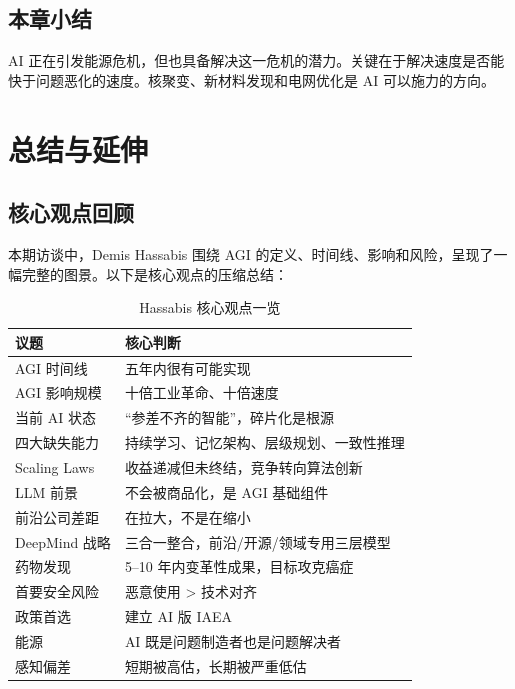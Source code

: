 \documentclass[a4paper]{article}
\begin{document}
\subsection{本章小结}

AI 正在引发能源危机，但也具备解决这一危机的潜力。关键在于解决速度是否能快于问题恶化的速度。核聚变、新材料发现和电网优化是 AI 可以施力的方向。

\section{总结与延伸}

\subsection{核心观点回顾}

本期访谈中，Demis Hassabis 围绕 AGI 的定义、时间线、影响和风险，呈现了一幅完整的图景。以下是核心观点的压缩总结：

\begin{table}[H]
\centering
\begin{tabular}{p{} p{}}
\toprule
\textbf{议题} & \textbf{核心判断} \\
\midrule
AGI 时间线 & 五年内很有可能实现 \\
AGI 影响规模 & 十倍工业革命、十倍速度 \\
当前 AI 状态 & ``参差不齐的智能''，碎片化是根源 \\
四大缺失能力 & 持续学习、记忆架构、层级规划、一致性推理 \\
Scaling Laws & 收益递减但未终结，竞争转向算法创新 \\
LLM 前景 & 不会被商品化，是 AGI 基础组件 \\
前沿公司差距 & 在拉大，不是在缩小 \\
DeepMind 战略 & 三合一整合，前沿/开源/领域专用三层模型 \\
药物发现 & 5--10 年内变革性成果，目标攻克癌症 \\
首要安全风险 & 恶意使用 > 技术对齐 \\
政策首选 & 建立 AI 版 IAEA \\
能源 & AI 既是问题制造者也是问题解决者 \\
感知偏差 & 短期被高估，长期被严重低估 \\
\bottomrule
\end{tabular}
\caption{Hassabis 核心观点一览}
\end{table}
\end{document}
